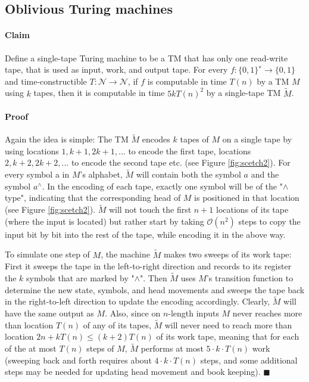 \documentclass[a4paper]{article}
\begin{document}
\subsection{Oblivious Turing machines}

\paragraph{Claim}
Define a single-tape Turing machine to be a TM that has only one read-write
tape, that is used as input, work, and output tape. For every $f : \{0, 1\}^{∗} \rightarrow \{0, 1\}$ and
time-constructible $T : \mathcal{N} \rightarrow \mathcal{N}$, if $f$ is computable in time $T(n)$ by a TM $M$ using $k$ tapes,
then it is computable in time $5kT(n)^2$ by a single-tape TM  $\widetilde{M}$.

\paragraph{Proof}
Again the idea is simple: The TM $\widetilde{M}$ encodes $k$ tapes of $M$ on a single
tape by using locations $1, k + 1, 2k + 1, ...$ to encode the first tape, locations $2, k +
2, 2k + 2, ...$ to encode the second tape etc. (see Figure \ref{fig:scetch2}). For every symbol a in
$M$'s alphabet, $\widetilde{M}$ will contain both the symbol $a$ and the symbol $a^\wedge$. In the encoding of
each tape, exactly one symbol will be of the "$\wedge$ type", indicating that the corresponding
head of $M$ is positioned in that location (see Figure \ref{fig:scetch2}). $\widetilde{M}$ will not touch the first
$n + 1$ locations of its tape (where the input is located) but rather start by taking $\mathcal{O}(n^2)$
steps to copy the input bit by bit into the rest of the tape, while encoding it in the
above way.

\par 
To simulate one step of $M$, the machine $\widetilde{M}$ makes two sweeps of its work tape: First it sweeps the tape in the left-to-right direction and records to its register the $k$ symbols
that are marked by "$\wedge$". Then $\widetilde{M}$ uses $M$'s transition function to determine the new state,
symbols, and head movements and sweeps the tape back in the right-to-left direction
to update the encoding accordingly. Clearly, $\widetilde{M}$ will have the same output as $M$. Also,
since on $n$-length inputs $M$ never reaches more than location $T(n)$ of any of its tapes, $\widetilde{M}$ will never need to reach more than location $2n + kT(n) \leq (k + 2)T(n)$ of its work tape,
meaning that for each of the at most $T(n)$ steps of $M$, $\widetilde{M}$ performs at most $5 \cdot k \cdot T(n)$
work (sweeping back and forth requires about $4 \cdot k \cdot T(n)$ steps, and some additional
steps may be needed for updating head movement and book keeping). $\blacksquare$
\end{document}
